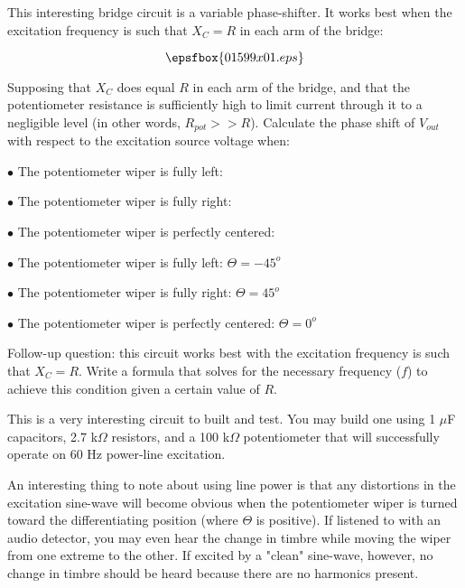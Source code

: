 

This interesting bridge circuit is a variable phase-shifter.  It works best when the excitation frequency is such that $X_C = R$ in each arm of the bridge:

$$\epsfbox{01599x01.eps}$$

Supposing that $X_C$ does equal $R$ in each arm of the bridge, and that the potentiometer resistance is sufficiently high to limit current through it to a negligible level (in other words, $R_{pot} >> R$).  Calculate the phase shift of $V_{out}$ with respect to the excitation source voltage when:

\medskip
\item{$\bullet$} The potentiometer wiper is fully left:
\item{$\bullet$} The potentiometer wiper is fully right:
\item{$\bullet$} The potentiometer wiper is perfectly centered:
\medskip







\medskip
\item{$\bullet$} The potentiometer wiper is fully left: $\Theta = -45^o$
\item{$\bullet$} The potentiometer wiper is fully right: $\Theta = 45^o$
\item{$\bullet$} The potentiometer wiper is perfectly centered: $\Theta = 0^o$
\medskip

\vskip 10pt

Follow-up question: this circuit works best with the excitation frequency is such that $X_C = R$.  Write a formula that solves for the necessary frequency ($f$) to achieve this condition given a certain value of $R$.







This is a very interesting circuit to built and test.  You may build one using 1 $\mu$F capacitors, 2.7 k$\Omega$ resistors, and a 100 k$\Omega$ potentiometer that will successfully operate on 60 Hz power-line excitation.

An interesting thing to note about using line power is that any distortions in the excitation sine-wave will become obvious when the potentiometer wiper is turned toward the differentiating position (where $\Theta$ is positive).  If listened to with an audio detector, you may even hear the change in timbre while moving the wiper from one extreme to the other.  If excited by a "clean" sine-wave, however, no change in timbre should be heard because there are no harmonics present.




